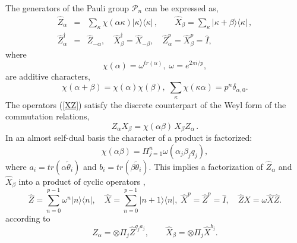 \documentclass{article}
\begin{document}
The generators of the Pauli group $\mathcal{P}_{n}$ can be expressed as, 
\begin{eqnarray}
\hat{Z}_{\alpha } &=&\sum_{\kappa }\chi \left( \alpha \kappa \right) |\kappa
\rangle \langle \kappa |\,,\qquad \hat{X}_{\beta }=\sum_{\kappa }|\kappa
+\beta \rangle \langle \kappa |\,,  \label{XZ} \\
\hat{Z}_{\alpha }^{\dagger } &=&\hat{Z}_{-\alpha },\quad \hat{X}_{\beta
}^{\dagger }=\hat{X}_{-\beta },\quad \hat{Z}_{\alpha }^{p}=\hat{X}_{\beta
}^{p}=\hat{I},
\end{eqnarray}%
where%
\begin{equation*}
\chi \left( \alpha \right) =\omega ^{tr\left( \alpha \right) },\;\omega
=e^{2\pi i/p},
\end{equation*}%
are additive characters, 
\begin{equation*}
\chi \left( \alpha +\beta \right) =\chi \left( \alpha \right) \chi \left(
\beta \right) ,\;\sum_{\kappa }\chi \left( \kappa \alpha \right)
=p^{n}\delta _{\alpha ,0}.
\end{equation*}%
The operators (\ref{XZ}) satisfy the discrete counterpart of the Weyl form
of the commutation relations, 
\begin{equation}
Z_{\alpha }X_{\beta }=\chi \left( \alpha \beta \right) \,X_{\beta }Z_{\alpha
}\,.  \label{commutation_relation}
\end{equation}%
In an almost self-dual basis the character of a product is factorized: \ 
\begin{equation}
\chi \left( \alpha \beta \right) =\Pi _{j=1}^{n}\omega \left( \alpha
_{j}\beta _{j}q_{j}\right) ,  \label{chi fact}
\end{equation}%
where $a_{i}=tr(\alpha \tilde{\theta}_{i})$ and $b_{i}=tr(\beta \tilde{\theta%
}_{i})$. This implies a factorization of $\hat{Z}_{\alpha }$ and $\hat{X}%
_{\beta }$ into a product of cyclic operators \cite{Schwinger1,Schwinger2}, 
\begin{equation}
\hat{Z}=\sum_{n=0}^{p-1}\omega ^{n}|n\rangle \langle n|,\quad \hat{X}%
=\sum_{n=0}^{p-1}|n+1\rangle \langle n|,\;\hat{X}^{p}=\hat{Z}^{p}=\hat{I}%
,\quad \hat{Z}\hat{X}=\omega \hat{X}\hat{Z}\text{.}
\end{equation}%
according to 
\begin{equation}
\hat{Z}_{\alpha }=\otimes \Pi _{j}\hat{Z}^{q_{j}a_{j}},\qquad \hat{X}_{\beta
}=\otimes \Pi _{j}\hat{X}^{b_{j}}.  \label{ZXq}
\end{equation}
\end{document}
